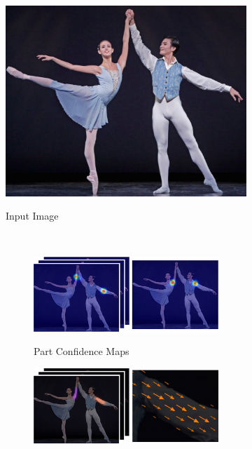\begin{figure}[t!]
  \begin{subfigure}[t]{0.24\textwidth}
    \includegraphics[width=1\linewidth]{img/openpose_pipeline_a}
    \label{fig:oppA}
    \caption{Input Image}
  \end{subfigure}%
  ~
  \begin{subfigure}[t]{0.24\textwidth}
    \centering
    \begin{subfigure}[b]{1\textwidth}
      \includegraphics[width=1\linewidth]{img/openpose_pipeline_b}
      \label{fig:oppB}
      \caption{Part Confidence Maps}
    \end{subfigure}
    \vspace{-.9em}
    \begin{subfigure}[b]{1\textwidth}
      \includegraphics[width=1\linewidth]{img/openpose_pipeline_c}

\end{subfigure}
\end{subfigure}
\end{figure}
